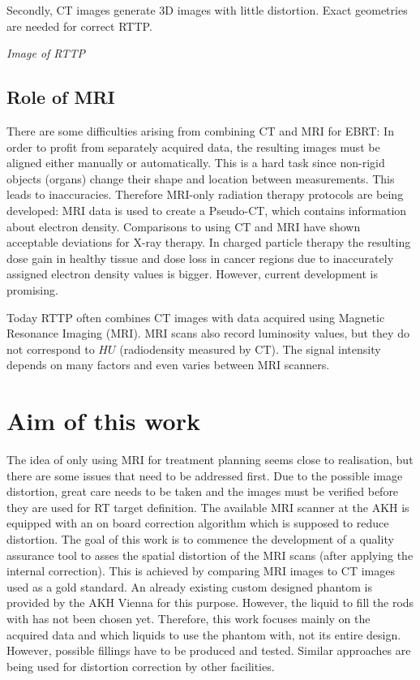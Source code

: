 Secondly, CT images generate 3D images with little distortion. Exact geometries are needed for correct RTTP. %

\vspace{4cm}
\textit{Image of RTTP}
\vspace{2cm}

\subsection{Role of MRI}
There are some difficulties arising from combining CT and MRI for EBRT:
In order to profit from separately acquired data, the resulting images must be aligned either manually or automatically. This is a hard task since non-rigid objects (organs) change their shape and location between measurements. This leads to inaccuracies.
Therefore MRI-only radiation therapy protocols are being developed:
MRI data is used to create a Pseudo-CT, which contains information about electron density. Comparisons to using CT and MRI have shown acceptable deviations for X-ray therapy.
In charged particle therapy the resulting dose gain in healthy tissue and dose loss in cancer regions due to inaccurately assigned electron density values is bigger.
However, current development is promising. \cite{Rank2013, Stanescu2006, Nyholm2015, Greer2015, Chen2004}


Today RTTP often combines CT images with data acquired using Magnetic Resonance Imaging (MRI).
MRI scans also record luminosity values, but they do not correspond to $HU$ (radiodensity measured by CT).
The signal intensity depends on many factors and even varies between MRI scanners.



\section{Aim of this work}
The idea of only using MRI for treatment planning seems close to realisation, but there are some issues that need to be addressed first.
Due to the possible image distortion, great care needs to be taken and the images must be verified before they are used for RT target definition.
The available MRI scanner at the AKH is equipped with an on board correction algorithm which is supposed to reduce distortion.
The goal of this work is to commence the development of a quality assurance tool to asses the spatial distortion of the MRI scans (after applying the internal correction).
This is achieved by comparing MRI images to CT images used as a gold standard.
An already existing custom designed phantom is provided by the AKH Vienna for this purpose.
However, the liquid to fill the rods with has not been chosen yet.
Therefore, this work focuses mainly on the acquired data and which liquids to use the phantom with, not its entire design.
However, possible fillings have to be produced and tested.
Similar approaches are being used for distortion correction by other facilities. \cite{Price2015, Petersch2004, Torfeh2015, Wang2004, Wang2004b, Mizowaki2000}

